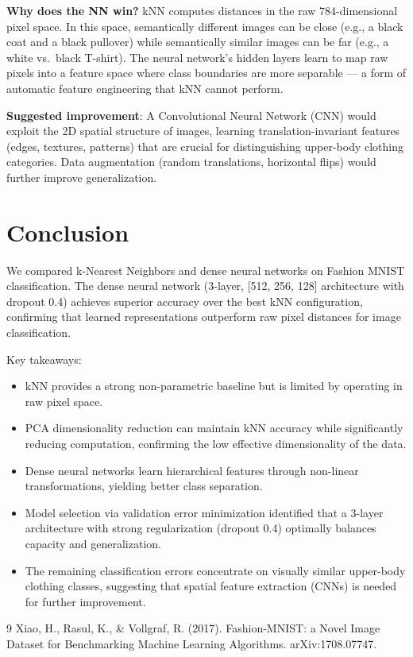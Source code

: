 \documentclass[11pt]{article}
\begin{document}
\textbf{Why does the NN win?} kNN computes distances in the raw 784-dimensional pixel space. In this space, semantically different images can be close (e.g., a black coat and a black pullover) while semantically similar images can be far (e.g., a white vs.\ black T-shirt). The neural network's hidden layers learn to map raw pixels into a feature space where class boundaries are more separable --- a form of automatic feature engineering that kNN cannot perform.

\textbf{Suggested improvement}: A Convolutional Neural Network (CNN) would exploit the 2D spatial structure of images, learning translation-invariant features (edges, textures, patterns) that are crucial for distinguishing upper-body clothing categories. Data augmentation (random translations, horizontal flips) would further improve generalization.

\section{Conclusion}

We compared k-Nearest Neighbors and dense neural networks on Fashion MNIST classification. The dense neural network (3-layer, [512, 256, 128] architecture with dropout 0.4) achieves superior accuracy over the best kNN configuration, confirming that learned representations outperform raw pixel distances for image classification.

Key takeaways:
\begin{itemize}[nosep]
	\item kNN provides a strong non-parametric baseline but is limited by operating in raw pixel space.
	\item PCA dimensionality reduction can maintain kNN accuracy while significantly reducing computation, confirming the low effective dimensionality of the data.
	\item Dense neural networks learn hierarchical features through non-linear transformations, yielding better class separation.
	\item Model selection via validation error minimization identified that a 3-layer architecture with strong regularization (dropout 0.4) optimally balances capacity and generalization.
	\item The remaining classification errors concentrate on visually similar upper-body clothing classes, suggesting that spatial feature extraction (CNNs) is needed for further improvement.
\end{itemize}

\begin{thebibliography}{9}
	 Xiao, H., Rasul, K., \& Vollgraf, R. (2017). Fashion-MNIST: a Novel Image Dataset for Benchmarking Machine Learning Algorithms. arXiv:1708.07747.
\end{thebibliography}
\end{document}
